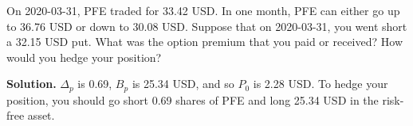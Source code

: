 \noindent On 2020-03-31, PFE traded for 33.42 USD. In one month, PFE can either go up to 36.76 USD or down to 30.08 USD. Suppose that on 2020-03-31, you went short a 32.15 USD put. What was the option premium that you paid or received? How would you hedge your position?

\vspace{9pt}

\noindent\textbf{Solution.} $\Delta_{p}$ is 0.69, $B_{p}$ is 25.34 USD, and so $P_{0}$ is 2.28 USD. To hedge your position, you should go short 0.69 shares of PFE and long 25.34 USD in the risk-free asset.